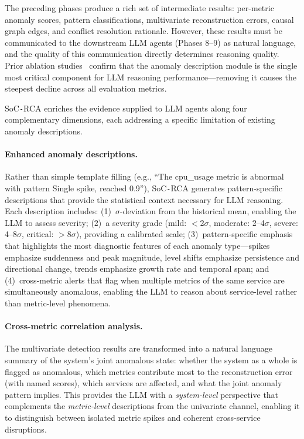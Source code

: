 \documentclass[a4paper,fleqn]{cas-dc}
\newcommand{\sysname}{SoC\texttt{-}RCA}
\begin{document}
The preceding phases produce a rich set of intermediate results: per-metric anomaly scores, pattern classifications, multivariate reconstruction errors, causal graph edges, and conflict resolution rationale.  However, these results must be communicated to the downstream LLM agents (Phases 8--9) as natural language, and the quality of this communication directly determines reasoning quality.  Prior ablation studies~\cite{11449471} confirm that the anomaly description module is the single most critical component for LLM reasoning performance---removing it causes the steepest decline across all evaluation metrics.

\sysname{} enriches the evidence supplied to LLM agents along four complementary dimensions, each addressing a specific limitation of existing anomaly descriptions.

\paragraph{Enhanced anomaly descriptions.}
Rather than simple template filling (e.g., ``The cpu\_usage metric is abnormal with pattern Single spike, reached 0.9''), \sysname{} generates pattern-specific descriptions that provide the statistical context necessary for LLM reasoning.  Each description includes: (1)~$\sigma$-deviation from the historical mean, enabling the LLM to assess severity; (2)~a severity grade (mild: $<$2$\sigma$, moderate: 2--4$\sigma$, severe: 4--8$\sigma$, critical: $>$8$\sigma$), providing a calibrated scale; (3)~pattern-specific emphasis that highlights the most diagnostic features of each anomaly type---spikes emphasize suddenness and peak magnitude, level shifts emphasize persistence and directional change, trends emphasize growth rate and temporal span; and (4)~cross-metric alerts that flag when multiple metrics of the same service are simultaneously anomalous, enabling the LLM to reason about service-level rather than metric-level phenomena.

\paragraph{Cross-metric correlation analysis.}
The multivariate detection results are transformed into a natural language summary of the system's joint anomalous state: whether the system as a whole is flagged as anomalous, which metrics contribute most to the reconstruction error (with named scores), which services are affected, and what the joint anomaly pattern implies.  This provides the LLM with a \emph{system-level} perspective that complements the \emph{metric-level} descriptions from the univariate channel, enabling it to distinguish between isolated metric spikes and coherent cross-service disruptions.
\end{document}
